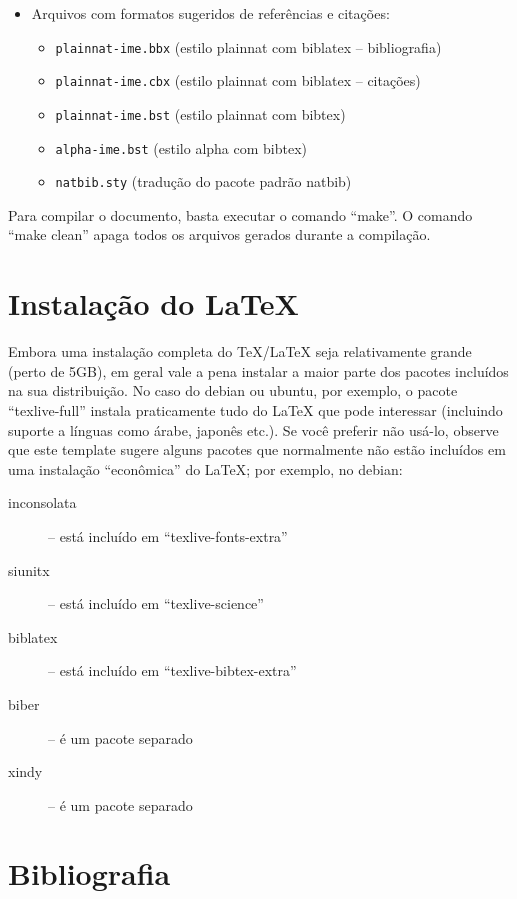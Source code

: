 \begin{itemize}
  \item Arquivos com formatos sugeridos de referências e citações:
  \begin{itemize}
    \item \texttt{plainnat-ime.bbx} (estilo plainnat com biblatex -- bibliografia)
    \item \texttt{plainnat-ime.cbx} (estilo plainnat com biblatex -- citações)
    \item \texttt{plainnat-ime.bst} (estilo plainnat com bibtex)
    \item \texttt{alpha-ime.bst} (estilo alpha com bibtex)
    \item \texttt{natbib.sty} (tradução do pacote padrão natbib)
  \end{itemize}
\end{itemize}

Para compilar o documento, basta executar o comando ``make''. O comando ``make
clean'' apaga todos os arquivos gerados durante a compilação.

\section{Instalação do \LaTeX{}}

Embora uma instalação completa do \TeX{}/\LaTeX{} seja relativamente grande (perto
de 5GB), em geral vale a pena instalar a maior parte dos pacotes incluídos
na sua distribuição. No caso do debian ou ubuntu, por exemplo, o pacote
``texlive-full'' instala praticamente tudo do \LaTeX{} que pode interessar (incluindo
suporte a línguas como árabe, japonês etc.). Se você preferir não usá-lo,
observe que este template sugere alguns pacotes que normalmente não estão
incluídos em uma instalação ``econômica'' do \LaTeX{}; por exemplo, no debian:

\begin{description}
  \item[inconsolata] -- está incluído em ``texlive-fonts-extra''
  \item [siunitx] -- está incluído em ``texlive-science''
  \item [biblatex] -- está incluído em ``texlive-bibtex-extra''
  \item [biber] -- é um pacote separado
  \item [xindy] -- é um pacote separado
\end{description}

\section{Bibliografia}

